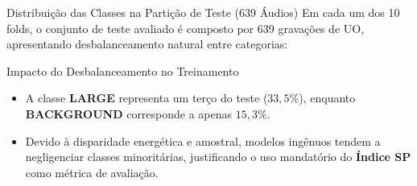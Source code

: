 \documentclass[aspectratio=169]{beamer}
\begin{document}
\begin{frame}{Distribui\c{c}\~{a}o das Classes na Parti\c{c}\~{a}o de Teste (639 \'{A}udios)}
    \small
    Em cada um dos 10 folds, o conjunto de teste avaliado \'{e} composto por 639 grava\c{c}\~{o}es de UO, apresentando desbalanceamento natural entre categorias:
    
    \vspace{0.1cm}
    \begin{table}[h]
    \centering
    \end{table}
    
    \vspace{0.1cm}
    \begin{block}{Impacto do Desbalanceamento no Treinamento}
        \begin{itemize}
            \item A classe \textbf{LARGE} representa um ter\c{c}o do teste ($33,5\%$), enquanto \textbf{BACKGROUND} corresponde a apenas $15,3\%$.
            \item Devido \`{a} disparidade energ\'{e}tica e amostral, modelos ing\^{e}nuos tendem a negligenciar classes minorit\'{a}rias, justificando o uso mandat\'{o}rio do \textbf{\'{I}ndice SP} como m\'{e}trica de avalia\c{c}\~{a}o.
        \end{itemize}
    \end{block}
\end{frame}
\end{document}
